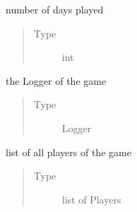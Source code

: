\documentclass[letterpaper,10pt,english]{sphinxmanual}
\begin{document}
\begin{fulllineitems}

\begin{fulllineitems}
\label{\detokenize{chatwolf:chatwolf.game.Game.nd}}
number of days played
\begin{quote}\begin{description}
\item[{Type}] \leavevmode
int

\end{description}\end{quote}

\end{fulllineitems}


\begin{fulllineitems}
\label{\detokenize{chatwolf:chatwolf.game.Game.log}}
the Logger of the game
\begin{quote}\begin{description}
\item[{Type}] \leavevmode
Logger

\end{description}\end{quote}

\end{fulllineitems}


\begin{fulllineitems}
\label{\detokenize{chatwolf:chatwolf.game.Game.players}}
list of all players of the game
\begin{quote}\begin{description}
\item[{Type}] \leavevmode
list of Players

\end{description}\end{quote}

\end{fulllineitems}



\end{fulllineitems}
\end{document}
